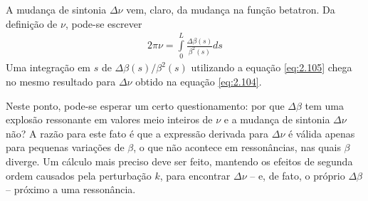 A mudança de sintonia $\Delta \nu$ vem, claro, da mudança na função betatron. Da definição de $\nu$, pode-se escrever
\begin{align}
	2\pi\nu = \int\limits_{0}^{L}\frac{\Delta \beta(s)}{\beta^2(s)}ds
\end{align}
Uma integração em $s$ de $\Delta \beta(s)/\beta^2(s)$ utilizando a equação \eqref{eq:2.105} chega no mesmo resultado para $\Delta \nu$ obtido na equação \eqref{eq:2.104}.

Neste ponto, pode-se esperar um certo questionamento: por que $\Delta \beta$ tem uma explosão ressonante em valores meio inteiros de $\nu$ e a mudança de sintonia $\Delta \nu$ não? A razão para este fato é que a expressão derivada para $\Delta \nu$ é válida apenas para pequenas variações de $\beta$, o que não acontece em ressonâncias, nas quais $\beta$ diverge. Um cálculo mais preciso deve ser feito, mantendo os efeitos de segunda ordem causados pela perturbação $k$, para encontrar $\Delta \nu$ -- e, de fato, o próprio $\Delta \beta$ -- próximo a uma ressonância.